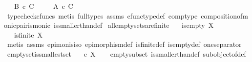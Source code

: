 \begin{isabellebody}
\ \ \ {\isachardoublequoteopen}B\ {\isasymle}\isactrlsub c\ C{\isachardoublequoteclose}\isanewline
\ \ \ \ \ {\isachardoublequoteopen}A\ {\isasymle}\isactrlsub c\ C{\isachardoublequoteclose}\isanewline
%
\isadelimproof
\ \ %
\endisadelimproof
%
\isatagproof
{}\isamarkupfalse%
\ {\isacharparenleft}{\kern0pt}typecheck{\isacharunderscore}{\kern0pt}cfuncs{\isacharcomma}{\kern0pt}\ metis\ {\isacharparenleft}{\kern0pt}full{\isacharunderscore}{\kern0pt}types{\isacharparenright}{\kern0pt}\ assms\ cfunc{\isacharunderscore}{\kern0pt}type{\isacharunderscore}{\kern0pt}def\ comp{\isacharunderscore}{\kern0pt}type\ composition{\isacharunderscore}{\kern0pt}of{\isacharunderscore}{\kern0pt}monic{\isacharunderscore}{\kern0pt}pair{\isacharunderscore}{\kern0pt}is{\isacharunderscore}{\kern0pt}monic\ is{\isacharunderscore}{\kern0pt}smaller{\isacharunderscore}{\kern0pt}than{\isacharunderscore}{\kern0pt}def{\isacharparenright}{\kern0pt}%
\endisatagproof
{\isafoldproof}%
%
\isadelimproof
\isanewline
%
\endisadelimproof
\isanewline
{}\isamarkupfalse%
\ all{\isacharunderscore}{\kern0pt}emptysets{\isacharunderscore}{\kern0pt}are{\isacharunderscore}{\kern0pt}finite{\isacharcolon}{\kern0pt}\isanewline
\ \ \ {\isachardoublequoteopen}is{\isacharunderscore}{\kern0pt}empty\ X{\isachardoublequoteclose}\isanewline
\ \ \ {\isachardoublequoteopen}is{\isacharunderscore}{\kern0pt}finite\ X{\isachardoublequoteclose}\isanewline
%
\isadelimproof
\ \ %
\endisadelimproof
%
\isatagproof
{}\isamarkupfalse%
\ {\isacharparenleft}{\kern0pt}metis\ assms\ epi{\isacharunderscore}{\kern0pt}mon{\isacharunderscore}{\kern0pt}is{\isacharunderscore}{\kern0pt}iso\ epimorphism{\isacharunderscore}{\kern0pt}def{}\ is{\isacharunderscore}{\kern0pt}finite{\isacharunderscore}{\kern0pt}def\ is{\isacharunderscore}{\kern0pt}empty{\isacharunderscore}{\kern0pt}def\ one{\isacharunderscore}{\kern0pt}separator{\isacharparenright}{\kern0pt}%
\endisatagproof
{\isafoldproof}%
%
\isadelimproof
\isanewline
%
\endisadelimproof
\isanewline
{}\isamarkupfalse%
\ emptyset{\isacharunderscore}{\kern0pt}is{\isacharunderscore}{\kern0pt}smallest{\isacharunderscore}{\kern0pt}set{\isacharcolon}{\kern0pt}\isanewline
\ \ {\isachardoublequoteopen}{\isasymemptyset}\ {\isasymle}\isactrlsub c\ X{\isachardoublequoteclose}\isanewline
%
\isadelimproof
\ \ %
\endisadelimproof
%
\isatagproof
{}\isamarkupfalse%
\ empty{\isacharunderscore}{\kern0pt}subset\ is{\isacharunderscore}{\kern0pt}smaller{\isacharunderscore}{\kern0pt}than{\isacharunderscore}{\kern0pt}def\ subobject{\isacharunderscore}{\kern0pt}of{\isacharunderscore}{\kern0pt}def{}\ \isamarkupfalse%

\end{isabellebody}
